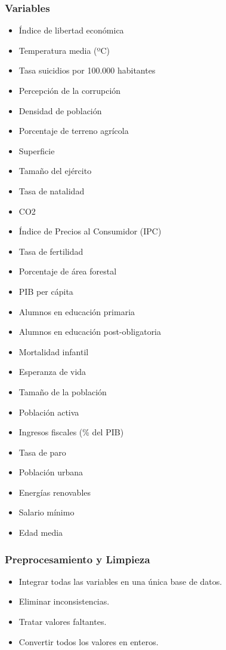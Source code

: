 \documentclass{beamer}
\newcommand{\slideauthor}[1]{\gdef\insertslideauthor{#1}}
\newcommand{\insertslideauthor}{}
\begin{document}
\begin{frame}
\frametitle{Variables}
\slideauthor{Javier Comyn}

\begin{multicols}{2} %
\footnotesize %
\begin{itemize}
    \item Índice de libertad económica
    \item Temperatura media (ºC)
    \item Tasa suicidios por 100.000 habitantes
    \item Percepción de la corrupción
    \item Densidad de población
    \item Porcentaje de terreno agrícola
    \item Superficie
    \item Tamaño del ejército
    \item Tasa de natalidad
    \item CO2
    \item Índice de Precios al Consumidor (IPC)
    \item Tasa de fertilidad
    \item Porcentaje de área forestal
\end{itemize}
\columnbreak %
\begin{itemize}
    \item PIB per cápita
    \item Alumnos en educación primaria
    \item Alumnos en educación post-obligatoria
    \item Mortalidad infantil
    \item Esperanza de vida
    \item Tamaño de la población
    \item Población activa
    \item Ingresos fiscales (\% del PIB)
    \item Tasa de paro
    \item Población urbana
    \item Energías renovables
    \item Salario mínimo
    \item Edad media
\end{itemize}
\end{multicols}
\end{frame}
\begin{frame}
\frametitle{Preprocesamiento y Limpieza}
\slideauthor{Javier Comyn}
\begin{itemize}
    \item Integrar todas las variables en una única base de datos.
    \item Eliminar inconsistencias.
    \item Tratar valores faltantes.
    \item Convertir todos los valores en enteros.
\end{itemize}
\end{frame}
\end{document}

